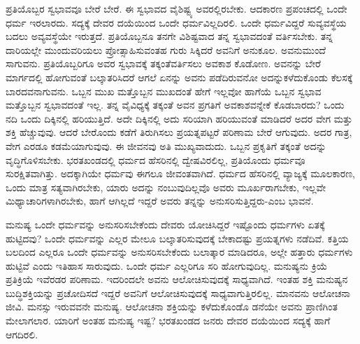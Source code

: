 ಪ್ರತಿಯೊಬ್ಬರ ಸ್ವಭಾವವೂ ಬೇರೆ ಬೇರೆ. ಈ ಸ್ವಭಾವದ ವೈಶಿಷ್ಟ್ಯ ಅವರಲ್ಲಿರಬೇಕು. ಆದಕಾರಣ ಪ್ರಪಂಚದಲ್ಲಿ ಒಂದೇ ಧರ್ಮ ಇರಲಾರದು. ಸದ್ಯಕ್ಕೆ ದೇವರ ದಯೆಯಿಂದ ಒಂದೇ ಧರ್ಮವಿಲ್ಲದಿರಲಿ. ಒಂದೇ ಧರ್ಮವಿದ್ದರೆ ಸುವ್ಯವಸ್ಥೆಯ ಬದಲು ಅವ್ಯವಸ್ಥೆಯೇ ಇರುತ್ತದೆ. ಪ್ರತಿಯೊಬ್ಬನೂ ತನಗೇ ವಿಶಿಷ್ಟವಾದ ತನ್ನ ಸ್ವಭಾವದಂತೆ ವರ್ತಿಸಬೇಕು. ತನ್ನ ದಾರಿಯಲ್ಲೇ ಮುಂದುವರಿಯಲು ಪ್ರೋತ್ಸಾಹಿಸುವಂತಹ ಗುರು ಸಿಕ್ಕಿದರೆ ಅವನಿಗೆ ಅನುಕೂಲ. ಅವನು\break ಮುಂದೆ ಸಾಗುವನು. ಪ್ರತಿಯೊಬ್ಬರಿಗೂ ಅವರ ಸ್ವಭಾವಕ್ಕೆ ತಕ್ಕಂತೆ\break ವರ್ತಿಸಲು ಅವಕಾಶ ಕೊಡೋಣ. ಅವನನ್ನು ಬೇರೆ ಮಾರ್ಗದಲ್ಲಿ ಹೋಗುವಂತೆ ಬಲ್ಕಾತರಿಸಿದರೆ ಆಗಲೆ ಏನನ್ನು ಅವನು ಪಡೆದಿರುವನೋ ಅದನ್ನು\break ಕಳೆದುಕೊಂಡು ಕೆಲಸಕ್ಕೆ ಬಾರದವನಾಗುವನು. ಒಬ್ಬನ ಮುಖ ಮತ್ತೊಬ್ಬನ ಮುಖದಂತೆ ಹೇಗೆ ಇಲ್ಲವೋ ಹಾಗೆಯೆ ಒಬ್ಬನ ಸ್ವಭಾವ ಮತ್ತೊಬ್ಬನ ಸ್ವಭಾವದಂತೆ ಇಲ್ಲ. ತನ್ನ ವೈವಿಧ್ಯಕ್ಕೆ ತಕ್ಕಂತೆ ಅವನ ಪ್ರಗತಿಗೆ ಅವಕಾಶವನ್ನೇಕೆ ಕೊಡಬಾರದು? ಒಂದು ನದಿ ಒಂದು ದಿಕ್ಕಿನಲ್ಲಿ ಹರಿಯುತ್ತಿದೆ. ಅದೇ ದಿಕ್ಕಿನಲ್ಲಿ ಅದು ಸರಿಯಾಗಿ ಹರಿಯುವಂತೆ ಮಾಡಿದರೆ ಅದರ ವೇಗ ಮತ್ತು ಶಕ್ತಿ ಹೆಚ್ಚುವುವು. ಆದರೆ ಬೇರೊಂದು ಕಡೆಗೆ ತಿರುಗಿಸಲು ಪ್ರಯತ್ನಪಟ್ಟರೆ ಪರಿಣಾಮ ಬೇರೆ ಆಗುವುದು. ಅದರ ಗಾತ್ರ, ವೇಗ ಎರಡೂ ಕಡಮೆಯಾಗುವುವು. ಈ ಜೀವನವು ಅತಿ ಮುಖ್ಯವಾದುದು. ಒಬ್ಬನ ಪ್ರಕೃತಿಗೆ ತಕ್ಕಂತೆ ಅದನ್ನು ವೃದ್ಧಿಗೊಳಿಸಬೇಕು. ಭರತಖಂಡದಲ್ಲಿ ಧರ್ಮದ ಹೆಸರಿನಲ್ಲಿ ದ್ವೇಷವಿರಲಿಲ್ಲ, ಪ್ರತಿಯೊಂದು ಧರ್ಮವೂ ಸುರಕ್ಷಿತವಾಗಿತ್ತು. ಅದಕ್ಕಾಗಿಯೇ ಧರ್ಮವು ಈಗಲೂ ಜೀವಂತವಾಗಿದೆ. ಧರ್ಮದ ಹೆಸರಿನಲ್ಲಿ ವ್ಯಾಜ್ಯಕ್ಕೆ ಮೂಲಕಾರಣ, ಒಂದು ಮಾತ್ರ ಸತ್ಯವಾಗಿರಬೇಕು, ಯಾರು ಅದನ್ನು ನಂಬುವುದಿಲ್ಲವೊ ಅವರು ಮೂರ್ಖರಾಗಬೇಕು, ಇಲ್ಲವೇ ಮಿಥ್ಯಾಚಾರಿಗಳಾಗಿರಬೇಕು, ಹಾಗೆ ಆಗಿಲ್ಲದೆ ಇದ್ದರೆ ಅವರು ತನ್ನನ್ನು ಅನುಸರಿಸುತ್ತಿದ್ದರು-ಎಂಬ ಭಾವನೆ.

ಮನುಷ್ಯ ಒಂದೇ ಧರ್ಮವನ್ನು ಅನುಸರಿಸಬೇಕೆಂದು ದೇವರು ಯೋಚಿಸಿದ್ದರೆ ಇಷ್ಟೊಂದು ಧರ್ಮಗಳು ಏತಕ್ಕೆ ಹುಟ್ಟಿದವು? ಒಂದೇ ಧರ್ಮವನ್ನು ಎಲ್ಲರ ಮೇಲೂ ಬಲ್ಕಾತರಿಸುವುದಕ್ಕೆ ಬೇಕಾದಷ್ಟು ಪ್ರಯತ್ನಗಳು ನಡೆದಿವೆ. ಕತ್ತಿಯ ಬಲದಿಂದ ಎಲ್ಲರೂ ಒಂದೇ ಧರ್ಮವನ್ನು ಅನುಸರಿಸಬೇಕೆಂದು ಬಲಾತ್ಕಾರ ಮಾಡಿದರೂ, ಅಲ್ಲೇ ಹತ್ತಾರು ಧರ್ಮಗಳು ಹುಟ್ಟಿವೆ ಎಂದು ಇತಿಹಾಸ ಸಾರುವುದು. ಒಂದೇ ಧರ್ಮ ಎಲ್ಲರಿಗೂ ಸರಿ ಹೋಗುವುದಿಲ್ಲ. ಮನುಷ್ಯನು ಕ್ರಿಯೆ ಪ್ರತಿಕ್ರಿಯೆ ಇವೆರಡರ ಪರಿಣಾಮ. ಇದರಿಂದಲೇ ಅವನು ಆಲೋಚಿಸುವುದಕ್ಕೆ ಸಾಧ್ಯವಾಗಿದೆ. ಇಂತಹ ಶಕ್ತಿ ಮನುಷ್ಯನ ಬುದ್ಧಿಶಕ್ತಿಯನ್ನು ಪ್ರಚೋದಿಸದೆ ಇದ್ದರೆ ಅವನಿಗೆ ಆಲೋಚಿಸುವುದಕ್ಕೆ ಸಾಧ್ಯವಾಗುತ್ತಿರಲಿಲ್ಲ. ಮಾನವನು ಆಲೋಚನಾ ಜೀವಿ. ಮನಸ್ಸು ಇರುವವನೇ ಮನುಷ್ಯ. ಆಲೋಚನಾ ಶಕ್ತಿಯನ್ನು ಕಳೆದುಕೊಂಡೊ ಡನೆಯೇ ಅವನು ಪ್ರಾಣಿಗಿಂತ ಮೇಲಾಗಲಾರ. ಯಾರಿಗೆ ಅಂತಹ ಮನುಷ್ಯ ಇಷ್ಟ? ಭರತಖಂಡದ ಜನರು ದೇವರ ದಯೆಯಿಂದ ಸದ್ಯಕ್ಕೆ ಹಾಗೆ ಆಗದಿರಲಿ.

